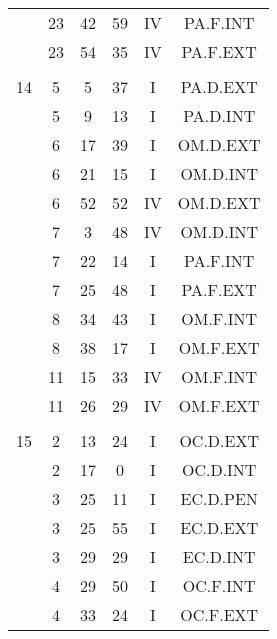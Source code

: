 \documentclass[12pt, a4paper]{article}
\begin{document}
\begin{multicols}{3}
{\begin{tabular}{c c c c c c}
	 	 	 	 & 23 & 42 & 59 & IV & PA.F.INT\\%
	 	 	 	 & 23 & 54 & 35 & IV & PA.F.EXT\\%
	 	 	 	 & & & & & \\%
	 	 	 	14 & 5 & 5 & 37 & I & PA.D.EXT\\%
	 	 	 	 & 5 & 9 & 13 & I & PA.D.INT\\%
	 	 	 	 & 6 & 17 & 39 & I & OM.D.EXT\\%
	 	 	 	 & 6 & 21 & 15 & I & OM.D.INT\\%
	 	 	 	 & 6 & 52 & 52 & IV & OM.D.EXT\\%
	 	 	 	 & 7 & 3 & 48 & IV & OM.D.INT\\%
	 	 	 	 & 7 & 22 & 14 & I & PA.F.INT\\%
	 	 	 	 & 7 & 25 & 48 & I & PA.F.EXT\\%
	 	 	 	 & 8 & 34 & 43 & I & OM.F.INT\\%
	 	 	 	 & 8 & 38 & 17 & I & OM.F.EXT\\%
	 	 	 	 & 11 & 15 & 33 & IV & OM.F.INT\\%
	 	 	 	 & 11 & 26 & 29 & IV & OM.F.EXT\\%
	 	 	 	 & & & & & \\%
	 	 	 	15 & 2 & 13 & 24 & I & OC.D.EXT\\%
	 	 	 	 & 2 & 17 & 0 & I & OC.D.INT\\%
	 	 	 	 & 3 & 25 & 11 & I & EC.D.PEN\\%
	 	 	 	 & 3 & 25 & 55 & I & EC.D.EXT\\%
	 	 	 	 & 3 & 29 & 29 & I & EC.D.INT\\%
	 	 	 	 & 4 & 29 & 50 & I & OC.F.INT\\%
	 	 	 	 & 4 & 33 & 24 & I & OC.F.EXT\\%

\end{tabular}}
\end{multicols}
\end{document}
